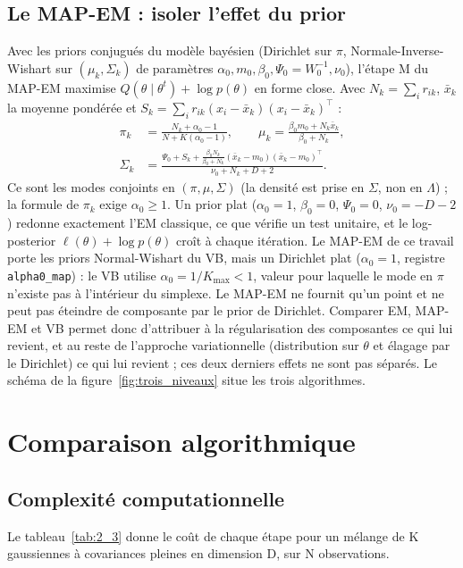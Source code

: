 \subsection{Le MAP-EM : isoler l'effet du prior}\label{sec:le_map_em_isoler_l}
Avec les priors conjugués du modèle bayésien (Dirichlet sur $\pi$, Normale-Inverse-Wishart sur $(\mu_k, \Sigma_k)$ de paramètres $\alpha_0, m_0, \beta_0, \Psi_0 = W_0^{-1}, \nu_0$), l'étape M du MAP-EM maximise $Q(\theta \mid \theta^t) + \log p(\theta)$ en forme close. Avec $N_k = \sum_i r_{ik}$, $\bar x_k$ la moyenne pondérée et $S_k = \sum_i r_{ik}(x_i - \bar x_k)(x_i - \bar x_k)^\top$ :
\begin{align*}
\pi_k &= \frac{N_k + \alpha_0 - 1}{N + K(\alpha_0 - 1)}, \qquad \mu_k = \frac{\beta_0 m_0 + N_k \bar x_k}{\beta_0 + N_k},\\
\Sigma_k &= \frac{\Psi_0 + S_k + \frac{\beta_0 N_k}{\beta_0 + N_k}(\bar x_k - m_0)(\bar x_k - m_0)^\top}{\nu_0 + N_k + D + 2}.
\end{align*}
Ce sont les modes conjoints en $(\pi, \mu, \Sigma)$ (la densité est prise en $\Sigma$, non en $\Lambda$) ; la formule de $\pi_k$ exige $\alpha_0 \geq 1$. Un prior plat ($\alpha_0 = 1$, $\beta_0 = 0$, $\Psi_0 = 0$, $\nu_0 = -D-2$) redonne exactement l'EM classique, ce que vérifie un test unitaire, et le log-posterior $\ell(\theta) + \log p(\theta)$ croît à chaque itération. Le MAP-EM de ce travail porte les priors Normal-Wishart du VB, mais un Dirichlet plat ($\alpha_0 = 1$, registre \texttt{alpha0\_map}) : le VB utilise $\alpha_0 = 1/K_{\max} < 1$, valeur pour laquelle le mode en $\pi$ n'existe pas à l'intérieur du simplexe. Le MAP-EM ne fournit qu'un point et ne peut pas éteindre de composante par le prior de Dirichlet. Comparer EM, MAP-EM et VB permet donc d'attribuer à la régularisation des composantes ce qui lui revient, et au reste de l'approche variationnelle (distribution sur $\theta$ et élagage par le Dirichlet) ce qui lui revient ; ces deux derniers effets ne sont pas séparés. Le schéma de la figure~\ref{fig:trois_niveaux} situe les trois algorithmes.




\section{Comparaison algorithmique}\label{sec:comparaison_algorithmique}
\subsection{Complexité computationnelle}\label{sec:complexite_computationnelle}
Le tableau~\ref{tab:2_3} donne le coût de chaque étape pour un mélange de K gaussiennes à covariances pleines en dimension D, sur N observations.

